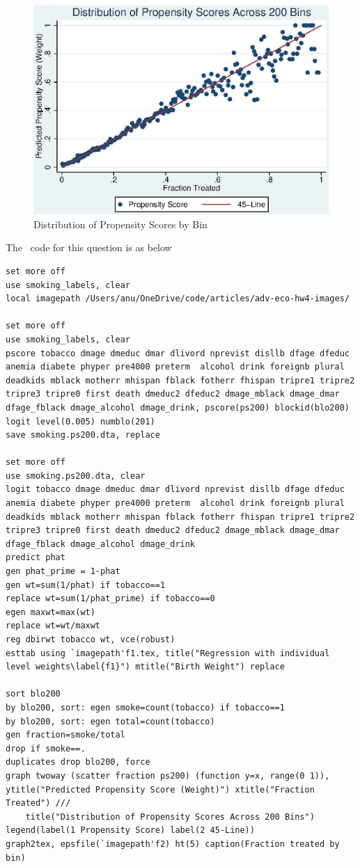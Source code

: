 \documentclass[12pt]{article}
\begin{document}
\begin{figure}[h]
\begin{centering}
  \includegraphics[width=\textwidth]{f2}
  \caption{Distribution of Propensity Scores by Bin}
  \label{f2}
\end{centering}
\end{figure}

The \stata \ code   for this question is as below
\begin{lstlisting}
set more off
use smoking_labels, clear
local imagepath /Users/anu/OneDrive/code/articles/adv-eco-hw4-images/

set more off
use smoking_labels, clear
pscore tobacco dmage dmeduc dmar dlivord nprevist disllb dfage dfeduc  anemia diabete phyper pre4000 preterm  alcohol drink foreignb plural deadkids mblack motherr mhispan fblack fotherr fhispan tripre1 tripre2 tripre3 tripre0 first death dmeduc2 dfeduc2 dmage_mblack dmage_dmar dfage_fblack dmage_alcohol dmage_drink, pscore(ps200) blockid(blo200) logit level(0.005) numblo(201)
save smoking.ps200.dta, replace

set more off
use smoking.ps200.dta, clear
logit tobacco dmage dmeduc dmar dlivord nprevist disllb dfage dfeduc  anemia diabete phyper pre4000 preterm  alcohol drink foreignb plural deadkids mblack motherr mhispan fblack fotherr fhispan tripre1 tripre2 tripre3 tripre0 first death dmeduc2 dfeduc2 dmage_mblack dmage_dmar dfage_fblack dmage_alcohol dmage_drink
predict phat
gen phat_prime = 1-phat
gen wt=sum(1/phat) if tobacco==1
replace wt=sum(1/phat_prime) if tobacco==0
egen maxwt=max(wt)
replace wt=wt/maxwt
reg dbirwt tobacco wt, vce(robust)
esttab using `imagepath'f1.tex, title("Regression with individual level weights\label{f1}") mtitle("Birth Weight") replace

sort blo200
by blo200, sort: egen smoke=count(tobacco) if tobacco==1
by blo200, sort: egen total=count(tobacco)
gen fraction=smoke/total
drop if smoke==.
duplicates drop blo200, force
graph twoway (scatter fraction ps200) (function y=x, range(0 1)), ytitle("Predicted Propensity Score (Weight)") xtitle("Fraction Treated") ///
	title("Distribution of Propensity Scores Across 200 Bins") legend(label(1 Propensity Score) label(2 45-Line))
graph2tex, epsfile(`imagepath'f2) ht(5) caption(Fraction treated by bin)

\end{lstlisting}
\end{document}

